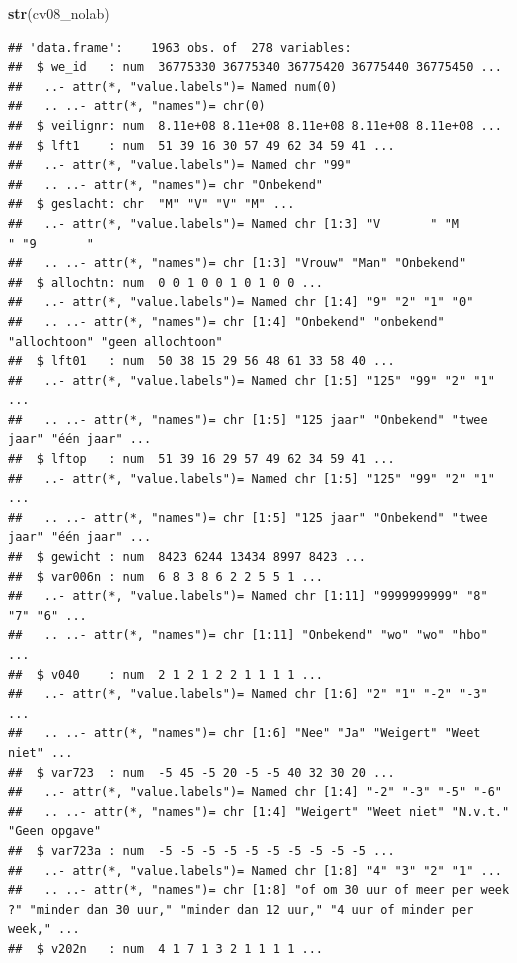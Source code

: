 \documentclass[
]{book}
\newenvironment{Shaded}{\begin{snugshade}}{\end{snugshade}}
\newcommand{\KeywordTok}[1]{\textcolor[rgb]{0.13,0.29,0.53}{\textbf{#1}}}
\newcommand{\NormalTok}[1]{#1}
\begin{document}
\begin{Shaded}
\begin{Highlighting}[numbers=left,,]
\KeywordTok{str}\NormalTok{(cv08_nolab)}
\end{Highlighting}
\end{Shaded}

\begin{verbatim}
## 'data.frame':    1963 obs. of  278 variables:
##  $ we_id   : num  36775330 36775340 36775420 36775440 36775450 ...
##   ..- attr(*, "value.labels")= Named num(0) 
##   .. ..- attr(*, "names")= chr(0) 
##  $ veilignr: num  8.11e+08 8.11e+08 8.11e+08 8.11e+08 8.11e+08 ...
##  $ lft1    : num  51 39 16 30 57 49 62 34 59 41 ...
##   ..- attr(*, "value.labels")= Named chr "99"
##   .. ..- attr(*, "names")= chr "Onbekend"
##  $ geslacht: chr  "M" "V" "V" "M" ...
##   ..- attr(*, "value.labels")= Named chr [1:3] "V       " "M       " "9       "
##   .. ..- attr(*, "names")= chr [1:3] "Vrouw" "Man" "Onbekend"
##  $ allochtn: num  0 0 1 0 0 1 0 1 0 0 ...
##   ..- attr(*, "value.labels")= Named chr [1:4] "9" "2" "1" "0"
##   .. ..- attr(*, "names")= chr [1:4] "Onbekend" "onbekend" "allochtoon" "geen allochtoon"
##  $ lft01   : num  50 38 15 29 56 48 61 33 58 40 ...
##   ..- attr(*, "value.labels")= Named chr [1:5] "125" "99" "2" "1" ...
##   .. ..- attr(*, "names")= chr [1:5] "125 jaar" "Onbekend" "twee jaar" "één jaar" ...
##  $ lftop   : num  51 39 16 29 57 49 62 34 59 41 ...
##   ..- attr(*, "value.labels")= Named chr [1:5] "125" "99" "2" "1" ...
##   .. ..- attr(*, "names")= chr [1:5] "125 jaar" "Onbekend" "twee jaar" "één jaar" ...
##  $ gewicht : num  8423 6244 13434 8997 8423 ...
##  $ var006n : num  6 8 3 8 6 2 2 5 5 1 ...
##   ..- attr(*, "value.labels")= Named chr [1:11] "9999999999" "8" "7" "6" ...
##   .. ..- attr(*, "names")= chr [1:11] "Onbekend" "wo" "wo" "hbo" ...
##  $ v040    : num  2 1 2 1 2 2 1 1 1 1 ...
##   ..- attr(*, "value.labels")= Named chr [1:6] "2" "1" "-2" "-3" ...
##   .. ..- attr(*, "names")= chr [1:6] "Nee" "Ja" "Weigert" "Weet niet" ...
##  $ var723  : num  -5 45 -5 20 -5 -5 40 32 30 20 ...
##   ..- attr(*, "value.labels")= Named chr [1:4] "-2" "-3" "-5" "-6"
##   .. ..- attr(*, "names")= chr [1:4] "Weigert" "Weet niet" "N.v.t." "Geen opgave"
##  $ var723a : num  -5 -5 -5 -5 -5 -5 -5 -5 -5 -5 ...
##   ..- attr(*, "value.labels")= Named chr [1:8] "4" "3" "2" "1" ...
##   .. ..- attr(*, "names")= chr [1:8] "of om 30 uur of meer per week ?" "minder dan 30 uur," "minder dan 12 uur," "4 uur of minder per week," ...
##  $ v202n   : num  4 1 7 1 3 2 1 1 1 1 ...

\end{verbatim}
\end{document}
